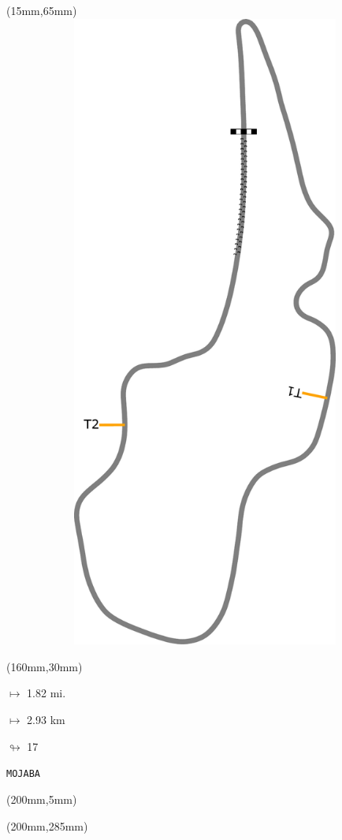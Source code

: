 \begin{textblock*}{185mm}(15mm,65mm)%
\centering
\mbox{\includegraphics[width=185mm,height=210mm,keepaspectratio]{PT/MOJABA.pdf}}
\end{textblock*}
\begin{textblock*}{40mm}(160mm,30mm)%
\Large
\par$\mapsto$ 1.82 mi.
\par$\mapsto$ 2.93 km
\par$\looparrowright$ 17
\par\hfill\tiny\tt MOJABA\\
\end{textblock*}
\begin{textblock*}{20mm}(200mm,5mm)%
\fbox{\thepage}
\label{MOJABA}
\end{textblock*}
\begin{textblock*}{20mm}(200mm,285mm)%
\fbox{\thepage}
\end{textblock*}

